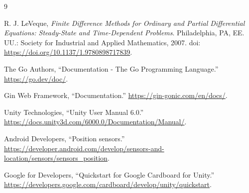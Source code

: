 \documentclass[12pt, a4paper]{article}
\begin{document}
\newpage

{}
\begin{thebibliography}{9}

R. J. LeVeque, \textit{Finite Difference Methods for Ordinary and Partial
Differential Equations: Steady-State and Time-Dependent Problems}.
Philadelphia, PA, EE. UU.: Society for Industrial and Applied Mathematics, 2007.
doi: \url{https://doi.org/10.1137/1.9780898717839}.

The Go Authors, ``Documentation - The Go Programming Language.''
\url{https://go.dev/doc/}.

Gin Web Framework, ``Documentation.''
\url{https://gin-gonic.com/en/docs/}.

Unity Technologies, ``Unity User Manual 6.0.''
\url{https://docs.unity3d.com/6000.0/Documentation/Manual/}.

Android Developers, ``Position sensors.''
\url{https://developer.android.com/develop/sensors-and-location/sensors/sensors_position}.

Google for Developers, ``Quickstart for Google Cardboard for Unity.''
\url{https://developers.google.com/cardboard/develop/unity/quickstart}.

\end{thebibliography}

\vfill
\end{document}
